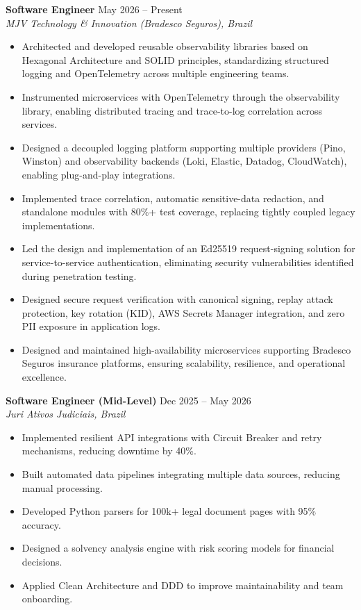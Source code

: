\documentclass[10pt,letterpaper]{article}
\begin{document}
\textbf{Software Engineer} \hfill May 2026 -- Present \\
\textit{MJV Technology \& Innovation (Bradesco Seguros), Brazil}
\begin{itemize}[leftmargin=*, itemsep=2pt]
    \item Architected and developed reusable observability libraries based on Hexagonal Architecture and SOLID principles, standardizing structured logging and OpenTelemetry across multiple engineering teams.
    \item Instrumented microservices with OpenTelemetry through the observability library, enabling distributed tracing and trace-to-log correlation across services.
    \item Designed a decoupled logging platform supporting multiple providers (Pino, Winston) and observability backends (Loki, Elastic, Datadog, CloudWatch), enabling plug-and-play integrations.
    \item Implemented trace correlation, automatic sensitive-data redaction, and standalone modules with 80\%+ test coverage, replacing tightly coupled legacy implementations.
    \item Led the design and implementation of an Ed25519 request-signing solution for service-to-service authentication, eliminating security vulnerabilities identified during penetration testing.
    \item Designed secure request verification with canonical signing, replay attack protection, key rotation (KID), AWS Secrets Manager integration, and zero PII exposure in application logs.
    \item Designed and maintained high-availability microservices supporting Bradesco Seguros insurance platforms, ensuring scalability, resilience, and operational excellence.
\end{itemize}

\textbf{Software Engineer (Mid-Level)} \hfill Dec 2025 -- May 2026 \\
\textit{Juri Ativos Judiciais, Brazil}
\begin{itemize}[leftmargin=*, itemsep=2pt]
    \item Implemented resilient API integrations with Circuit Breaker and retry mechanisms, reducing downtime by 40\%.
    \item Built automated data pipelines integrating multiple data sources, reducing manual processing.
    \item Developed Python parsers for 100k+ legal document pages with 95\% accuracy.
    \item Designed a solvency analysis engine with risk scoring models for financial decisions.
    \item Applied Clean Architecture and DDD to improve maintainability and team onboarding.
\end{itemize}
\end{document}
